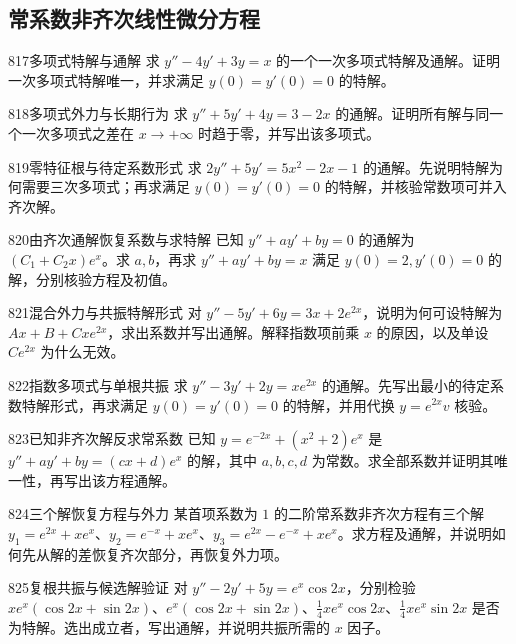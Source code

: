 \subsection{常系数非齐次线性微分方程}
\begin{exercise}{817}{多项式特解与通解}
求 $y''-4y'+3y=x$ 的一个一次多项式特解及通解。证明一次多项式特解唯一，并求满足 $y(0)=y'(0)=0$ 的特解。
\end{exercise}
\begin{exercise}{818}{多项式外力与长期行为}
求 $y''+5y'+4y=3-2x$ 的通解。证明所有解与同一个一次多项式之差在 $x\to+\infty$ 时趋于零，并写出该多项式。
\end{exercise}
\begin{exercise}{819}{零特征根与待定系数形式}
求 $2y''+5y'=5x^2-2x-1$ 的通解。先说明特解为何需要三次多项式；再求满足 $y(0)=y'(0)=0$ 的特解，并核验常数项可并入齐次解。
\end{exercise}
\begin{exercise}{820}{由齐次通解恢复系数与求特解}
已知 $y''+ay'+by=0$ 的通解为 $(C_1+C_2x)e^x$。求 $a,b$，再求 $y''+ay'+by=x$ 满足 $y(0)=2,y'(0)=0$ 的解，分别核验方程及初值。
\end{exercise}
\begin{exercise}{821}{混合外力与共振特解形式}
对 $y''-5y'+6y=3x+2e^{2x}$，说明为何可设特解为 $Ax+B+Cxe^{2x}$，求出系数并写出通解。解释指数项前乘 $x$ 的原因，以及单设 $Ce^{2x}$ 为什么无效。
\end{exercise}
\begin{exercise}{822}{指数多项式与单根共振}
求 $y''-3y'+2y=xe^{2x}$ 的通解。先写出最小的待定系数特解形式，再求满足 $y(0)=y'(0)=0$ 的特解，并用代换 $y=e^{2x}v$ 核验。
\end{exercise}
\begin{exercise}{823}{已知非齐次解反求常系数}
已知 $y=e^{-2x}+(x^2+2)e^x$ 是 $y''+ay'+by=(cx+d)e^x$ 的解，其中 $a,b,c,d$ 为常数。求全部系数并证明其唯一性，再写出该方程通解。
\end{exercise}
\begin{exercise}{824}{三个解恢复方程与外力}
某首项系数为 $1$ 的二阶常系数非齐次方程有三个解 $y_1=e^{2x}+xe^x$、$y_2=e^{-x}+xe^x$、$y_3=e^{2x}-e^{-x}+xe^x$。求方程及通解，并说明如何先从解的差恢复齐次部分，再恢复外力项。
\end{exercise}
\begin{exercise}{825}{复根共振与候选解验证}
对 $y''-2y'+5y=e^x\cos2x$，分别检验 $xe^x(\cos2x+\sin2x)$、$e^x(\cos2x+\sin2x)$、$\frac14xe^x\cos2x$、$\frac14xe^x\sin2x$ 是否为特解。选出成立者，写出通解，并说明共振所需的 $x$ 因子。
\end{exercise}
